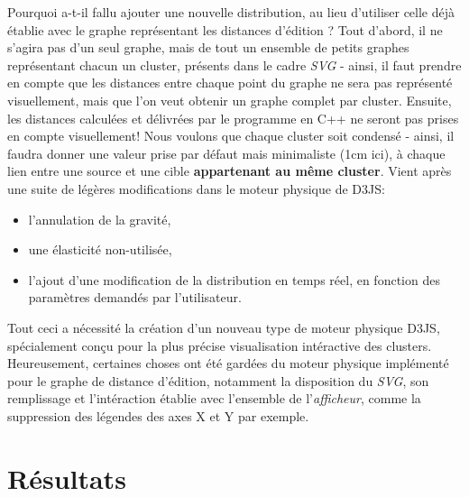 \documentclass[12pt]{report}
\begin{document}
\begin{spacing}{1.2}
Pourquoi a-t-il fallu ajouter une nouvelle distribution, au lieu d'utiliser celle déjà établie avec le graphe représentant les distances d'édition ?
\newline
Tout d'abord, il ne s'agira pas d'un seul graphe, mais de tout un ensemble de petits graphes représentant chacun un cluster, présents dans le cadre \textit{SVG} - ainsi, il faut prendre en compte que les distances entre chaque point du graphe ne sera pas représenté visuellement, mais que l'on veut obtenir un graphe complet par cluster.
\newline
Ensuite, les distances calculées et délivrées par le programme en C++ ne seront pas prises en compte visuellement! Nous voulons que chaque cluster soit condensé - ainsi, il faudra donner une valeur prise par défaut mais minimaliste (1cm ici), à chaque lien entre une source et une cible \textbf{appartenant au même cluster}.
\newline
Vient après une suite de légères modifications dans le moteur physique de D3JS:
	\begin{itemize}
	\item{l'annulation de la gravité,}
	\item{une élasticité non-utilisée,}
	\item{l'ajout d'une modification de la distribution en temps réel, en fonction des paramètres demandés par l'utilisateur.}
	\end{itemize}
Tout ceci a nécessité la création d'un nouveau type de moteur physique D3JS, spécialement conçu pour la plus précise visualisation intéractive des clusters.
\newline
Heureusement, certaines choses ont été gardées du moteur physique implémenté pour le graphe de distance d'édition, notamment la disposition du \textit{SVG}, son remplissage et l'intéraction établie avec l'ensemble de l'\textit{afficheur}, comme la suppression des légendes des axes X et Y par exemple.

\section{Résultats}


\end{spacing}
\end{document}
